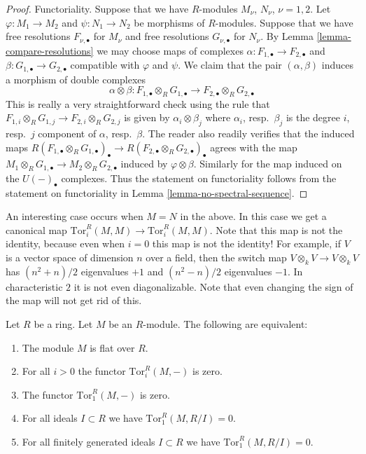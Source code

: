 \begin{proof}
\medskip\noindent
Functoriality. Suppose that we have $R$-modules $M_\nu$, $N_\nu$,
$\nu = 1,2$. Let $\varphi : M_1 \to M_2$ and $\psi : N_1 \to N_2$
be morphisms of $R$-modules.
Suppose that we have free resolutions $F_{\nu, \bullet}$
for $M_\nu$ and free resolutions $G_{\nu, \bullet}$ for $N_\nu$.
By Lemma \ref{lemma-compare-resolutions} we may choose
maps of complexes $\alpha : F_{1, \bullet} \to F_{2, \bullet}$
and $\beta : G_{1, \bullet} \to G_{2, \bullet}$ compatible
with $\varphi$ and $\psi$. We claim that
the pair $(\alpha, \beta)$ induces a morphism of double
complexes
$$
\alpha \otimes \beta :
F_{1, \bullet} \otimes_R G_{1, \bullet}
\longrightarrow
F_{2, \bullet} \otimes_R G_{2, \bullet}
$$
This is really a very straightforward check using the rule
that $F_{1,i} \otimes_R G_{1,j} \to F_{2,i} \otimes_R G_{2,j}$
is given by $\alpha_i \otimes \beta_j$ where $\alpha_i$, resp.\ 
$\beta_j$ is the degree $i$, resp.\ $j$ component of $\alpha$,
resp.\ $\beta$. The reader also readily verifies that the
induced maps $R(F_{1, \bullet} \otimes_R G_{1, \bullet})_\bullet
\to R(F_{2, \bullet} \otimes_R G_{2, \bullet})_\bullet$
agrees with the map $M_1 \otimes_R G_{1,\bullet}
\to M_2 \otimes_R G_{2, \bullet}$ induced by $\varphi \otimes \beta$.
Similarly for the map induced on the $U(-)_\bullet$ complexes.
Thus the statement on functoriality follows from the statement
on functoriality in Lemma \ref{lemma-no-spectral-sequence}.
\end{proof}

\begin{remark}
\label{remark-curiosity-signs-swap}
An interesting case occurs when $M = N$ in the above.
In this case we get a canonical map $\text{Tor}_i^R(M, M)
\to \text{Tor}_i^R(M, M)$. Note that this map is not the
identity, because even when $i = 0$ this map is not the
identity! For example, if $V$ is a vector space of dimension
$n$ over a field, then the switch map $V \otimes_k V \to V\otimes_k V$
has $(n^2+n)/2$ eigenvalues $+1$ and $(n^2-n)/2$ eigenvalues
$-1$. In characteristic $2$ it is not even diagonalizable.
Note that even changing the sign of the map will not get rid
of this.
\end{remark}

\begin{lemma}
\label{lemma-characterize-flat}
Let $R$ be a ring. Let $M$ be an $R$-module. 
The following are equivalent:
\begin{enumerate}
\item The module $M$ is flat over $R$.
\item For all $i>0$ the functor $\text{Tor}_i^R(M, -)$ is zero.
\item The functor $\text{Tor}_1^R(M, -)$ is zero.
\item For all ideals $I \subset R$ we have $\text{Tor}_1^R(M, R/I) = 0$.
\item For all finitely generated ideals $I \subset R$ we have
$\text{Tor}_1^R(M, R/I) = 0$.
\end{enumerate}
\end{lemma}


